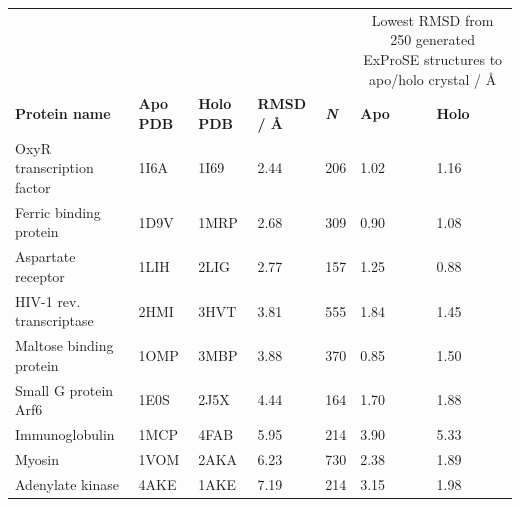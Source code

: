 \begin{table}
\centering

\begin{small}
\begin{tabular}{rrrrrll}
\hline
      &       &       &       &       & \multicolumn{2}{c}{Lowest RMSD from 250 generated ExProSE structures to apo/holo crystal / \AA} \\
\multicolumn{1}{l}{\textbf{Protein name}} & \multicolumn{1}{l}{\textbf{Apo PDB}} & \multicolumn{1}{l}{\textbf{Holo PDB}} & \multicolumn{1}{l}{\textbf{RMSD / \AA}} & \multicolumn{1}{l}{\textit{\textbf{N}}} & \textbf{Apo} & \textbf{Holo} \\
\hline
\multicolumn{1}{l}{OxyR transcription factor} & \multicolumn{1}{l}{1I6A} & \multicolumn{1}{l}{1I69} & \multicolumn{1}{l}{2.44} & \multicolumn{1}{l}{206} & 1.02  & 1.16 \\
\multicolumn{1}{l}{Ferric binding protein}    & \multicolumn{1}{l}{1D9V} & \multicolumn{1}{l}{1MRP} & \multicolumn{1}{l}{2.68} & \multicolumn{1}{l}{309} & 0.90  & 1.08 \\
\multicolumn{1}{l}{Aspartate receptor}        & \multicolumn{1}{l}{1LIH} & \multicolumn{1}{l}{2LIG} & \multicolumn{1}{l}{2.77} & \multicolumn{1}{l}{157} & 1.25  & 0.88 \\
\multicolumn{1}{l}{HIV-1 rev. transcriptase}  & \multicolumn{1}{l}{2HMI} & \multicolumn{1}{l}{3HVT} & \multicolumn{1}{l}{3.81} & \multicolumn{1}{l}{555} & 1.84  & 1.45 \\
\multicolumn{1}{l}{Maltose binding protein}   & \multicolumn{1}{l}{1OMP} & \multicolumn{1}{l}{3MBP} & \multicolumn{1}{l}{3.88} & \multicolumn{1}{l}{370} & 0.85  & 1.50 \\
\multicolumn{1}{l}{Small G protein Arf6}      & \multicolumn{1}{l}{1E0S} & \multicolumn{1}{l}{2J5X} & \multicolumn{1}{l}{4.44} & \multicolumn{1}{l}{164} & 1.70  & 1.88 \\
\multicolumn{1}{l}{Immunoglobulin}            & \multicolumn{1}{l}{1MCP} & \multicolumn{1}{l}{4FAB} & \multicolumn{1}{l}{5.95} & \multicolumn{1}{l}{214} & 3.90  & 5.33 \\
\multicolumn{1}{l}{Myosin}                    & \multicolumn{1}{l}{1VOM} & \multicolumn{1}{l}{2AKA} & \multicolumn{1}{l}{6.23} & \multicolumn{1}{l}{730} & 2.38  & 1.89 \\
\multicolumn{1}{l}{Adenylate kinase}          & \multicolumn{1}{l}{4AKE} & \multicolumn{1}{l}{1AKE} & \multicolumn{1}{l}{7.19} & \multicolumn{1}{l}{214} & 3.15  & 1.98 \\

\end{tabular}
\end{small}
\end{table}
